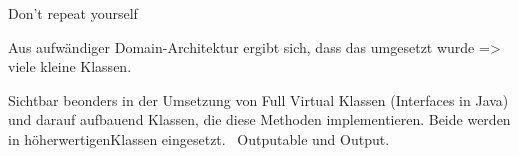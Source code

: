 
Don't repeat yourself

Aus aufwändiger Domain-Architektur ergibt sich, dass das umgesetzt wurde => viele kleine Klassen.



Sichtbar beonders in der Umsetzung von Full Virtual Klassen (Interfaces in Java) und darauf aufbauend Klassen, die diese Methoden implementieren.
Beide werden in \glq höherwertigen\grqq Klassen eingesetzt. \zB\ Outputable und Output.



